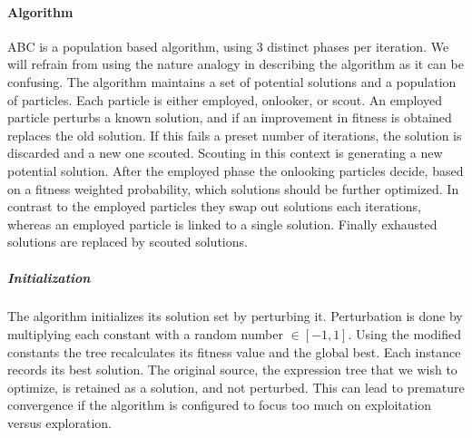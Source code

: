 \paragraph{Algorithm}
ABC is a population based algorithm, using 3 distinct phases per iteration. We will refrain from using the nature analogy in describing the algorithm as it can be confusing. The algorithm maintains a set of potential solutions and a population of particles. Each particle is either employed, onlooker, or scout. An employed particle perturbs a known solution, and if an improvement in fitness is obtained replaces the old solution. If this fails a preset number of iterations, the solution is discarded and a new one scouted. Scouting in this context is generating a new potential solution. After the employed phase the onlooking particles decide, based on a fitness weighted probability, which solutions should be further optimized. In contrast to the employed particles they swap out solutions each iterations, whereas an employed particle is linked to a single solution. Finally exhausted solutions are replaced by scouted solutions.
\subparagraph{Initialization}
The algorithm initializes its solution set by perturbing it. Perturbation is done by multiplying each constant with a random number $\in [-1,1]$. Using the modified constants the tree recalculates its fitness value and the global best. Each instance records its best solution.
The original source, the expression tree that we wish to optimize, is retained as a solution, and not perturbed. This can lead to premature convergence if the algorithm is configured to focus too much on exploitation versus exploration.
 
